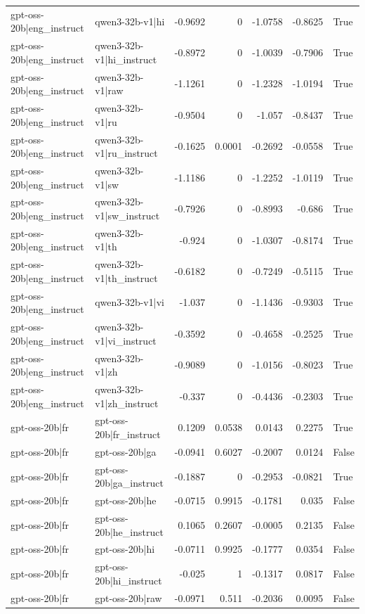 \begin{table}
\begin{tabular}{l l r r r r l}
gpt-oss-20b|eng_instruct & qwen3-32b-v1|hi & -0.9692 & 0 & -1.0758 & -0.8625 & True \\
gpt-oss-20b|eng_instruct & qwen3-32b-v1|hi_instruct & -0.8972 & 0 & -1.0039 & -0.7906 & True \\
gpt-oss-20b|eng_instruct & qwen3-32b-v1|raw & -1.1261 & 0 & -1.2328 & -1.0194 & True \\
gpt-oss-20b|eng_instruct & qwen3-32b-v1|ru & -0.9504 & 0 & -1.057 & -0.8437 & True \\
gpt-oss-20b|eng_instruct & qwen3-32b-v1|ru_instruct & -0.1625 & 0.0001 & -0.2692 & -0.0558 & True \\
gpt-oss-20b|eng_instruct & qwen3-32b-v1|sw & -1.1186 & 0 & -1.2252 & -1.0119 & True \\
gpt-oss-20b|eng_instruct & qwen3-32b-v1|sw_instruct & -0.7926 & 0 & -0.8993 & -0.686 & True \\
gpt-oss-20b|eng_instruct & qwen3-32b-v1|th & -0.924 & 0 & -1.0307 & -0.8174 & True \\
gpt-oss-20b|eng_instruct & qwen3-32b-v1|th_instruct & -0.6182 & 0 & -0.7249 & -0.5115 & True \\
gpt-oss-20b|eng_instruct & qwen3-32b-v1|vi & -1.037 & 0 & -1.1436 & -0.9303 & True \\
gpt-oss-20b|eng_instruct & qwen3-32b-v1|vi_instruct & -0.3592 & 0 & -0.4658 & -0.2525 & True \\
gpt-oss-20b|eng_instruct & qwen3-32b-v1|zh & -0.9089 & 0 & -1.0156 & -0.8023 & True \\
gpt-oss-20b|eng_instruct & qwen3-32b-v1|zh_instruct & -0.337 & 0 & -0.4436 & -0.2303 & True \\
gpt-oss-20b|fr & gpt-oss-20b|fr_instruct & 0.1209 & 0.0538 & 0.0143 & 0.2275 & True \\
gpt-oss-20b|fr & gpt-oss-20b|ga & -0.0941 & 0.6027 & -0.2007 & 0.0124 & False \\
gpt-oss-20b|fr & gpt-oss-20b|ga_instruct & -0.1887 & 0 & -0.2953 & -0.0821 & True \\
gpt-oss-20b|fr & gpt-oss-20b|he & -0.0715 & 0.9915 & -0.1781 & 0.035 & False \\
gpt-oss-20b|fr & gpt-oss-20b|he_instruct & 0.1065 & 0.2607 & -0.0005 & 0.2135 & False \\
gpt-oss-20b|fr & gpt-oss-20b|hi & -0.0711 & 0.9925 & -0.1777 & 0.0354 & False \\
gpt-oss-20b|fr & gpt-oss-20b|hi_instruct & -0.025 & 1 & -0.1317 & 0.0817 & False \\
gpt-oss-20b|fr & gpt-oss-20b|raw & -0.0971 & 0.511 & -0.2036 & 0.0095 & False \\

\end{tabular}
\end{table}
